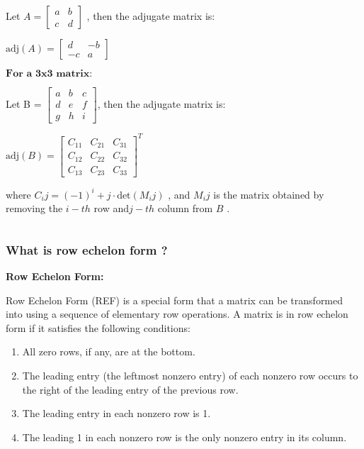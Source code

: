\documentclass[11pt]{article}
\makeatletter
\providecommand{\tightlist}{%
      \setlength{\itemsep}{0pt}\setlength{\parskip}{0pt}}
\newcommand{\boxspacing}{\kern\kvtcb@left@rule\kern\kvtcb@boxsep}
\newcommand{\prompt}[4]{
        {\ttfamily\llap{{\color{#2}[#3]:\hspace{3pt}#4}}\vspace{-\baselineskip}}
    }
\makeatother
\begin{document}
Let $  A =\begin{bmatrix} a & b \\ c & d \end{bmatrix}$ , then the adjugate matrix is:

$  \text{adj}(A) =\begin{bmatrix} d & -b \\ -c & a \end{bmatrix}$

$ \textbf{For a 3x3 matrix:} $

Let B =
$\begin{bmatrix} a & b & c \\ d & e & f \\ g & h & i \end{bmatrix}$,
then the adjugate matrix is:

$ \text{adj}(B) = \begin{bmatrix} C_{11} & C_{21} & C_{31} \\ C_{12} & C_{22} & C_{32} \\ C_{13} & C_{23} & C_{33} \end{bmatrix}^T $

where $  C_ij = (-1)^i+j \cdot \text{det}(M_ij)$ , and
$  M_ij$  is the matrix obtained by removing the $  i-th $ row and$  j-th $  column from $  B $ .

    \begin{tcolorbox}[breakable, size=fbox, boxrule=1pt, pad at break*=1mm,colback=cellbackground, colframe=cellborder]
\prompt{In}{incolor}{ }{\boxspacing}
\begin{Verbatim}[commandchars=\\\{\}]

\end{Verbatim}
\end{tcolorbox}

    \hypertarget{what-is-row-echelon-form}{%
\subsubsection{What is row echelon form
?}\label{what-is-row-echelon-form}}

    \textbf{Row Echelon Form:}

Row Echelon Form (REF) is a special form that a matrix can be
transformed into using a sequence of elementary row operations. A matrix
is in row echelon form if it satisfies the following conditions:

\begin{enumerate}
\def\labelenumi{\arabic{enumi}.}
\tightlist
\item
  All zero rows, if any, are at the bottom.
\item
  The leading entry (the leftmost nonzero entry) of each nonzero row
  occurs to the right of the leading entry of the previous row.
\item
  The leading entry in each nonzero row is 1.
\item
  The leading 1 in each nonzero row is the only nonzero entry in its
  column.
\end{enumerate}
\end{document}
